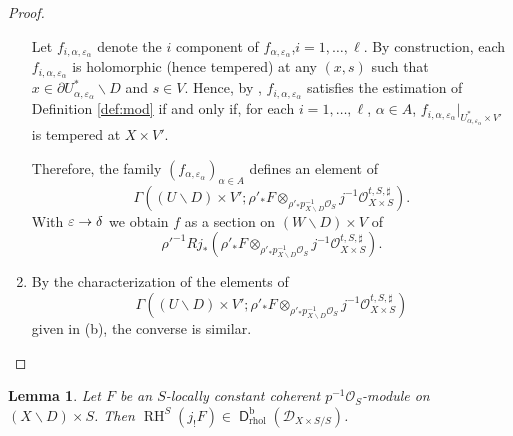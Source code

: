 \documentclass[english]{smfart}
\numberwithin{subsection}{section}
\def\shd{\mathcal{D}}\let\cD\shd
\def\sho{\mathcal{O}}\let\cO\sho
\DeclareMathOperator{\RH}{RH}
\newcommand{\rb}{\mathrm{b}}
\newcommand{\rhol}{\mathrm{rhol}}
\newcommand{\XS}{X\times S}
\newcommand{\DXS}{\shd_{\XS/S}}
\DeclareMathOperator{\rD}{\mathsf{D}}
\let\epsilon\varepsilon
\let\setminus\smallsetminus
\newcommand{\pOS}{p^{-1}\sho_S}
\numberwithin{equation}{section}
\theoremstyle{plain}
\newtheorem{lemma}[equation]{Lemma}
\theoremstyle{definition}
\def\to{\mathchoice{\longrightarrow}{\rightarrow}{\rightarrow}{\rightarrow}}
\begin{document}
\begin{proof}
\begin{enumerate}
Let ${f_{i,\alpha,\epsilon_{\alpha}}}$ denote the $i$ component of $f_{\alpha,\epsilon_{\alpha}}$,$i=1,\dots,\ell$.
By construction, each $f_{i,\alpha,\epsilon_{\alpha}}$ is holomorphic (hence tempered) at any $(x,s)$ such that $x\in\partial U^*_{\alpha,\epsilon_{\alpha}}\setminus D$ and $s\in V$. Hence, by \cite[Prop.\,5.8]{MF-P14}, $f_{i,\alpha,\epsilon_{\alpha}}$ satisfies the estimation of Definition \ref{def:mod} if and only if, for each $i=1,\dots, \ell$, $\alpha \in A$, $f_{i,\alpha,\epsilon_{\alpha}}|_{U^*_{\alpha,\epsilon_{\alpha}}\times V'}$ is tempered at $X\times V'$.

Therefore, the family $(f_{\alpha,\epsilon_{\alpha}})_{\alpha\in A}$ defines an element of
\[
\Gamma((U\setminus D)\times V'; \rho'_*F\otimes_{\rho'_*p_{X\setminus D}^{-1}\sho_S} j^{-1}\sho^{t, S,\sharp}_{\XS}).
\]
With $\epsilon \to \delta$ we obtain $f$ as a section on $(W\setminus D)\times V$ of
\[
\rho'^{-1}Rj_*(\rho'_*F{\otimes}_{\rho'_*p_{X\setminus D}^{-1}\sho_S} j^{-1}\sho^{t, S,\sharp}_{\XS}).
\]

\item
By the characterization of the elements of
\[
\Gamma((U\setminus D)\times V'; \rho'_*F\otimes_{\rho'_*p_{X\setminus D}^{-1}\sho_S} j^{-1}\sho^{t, S,\sharp}_{\XS})
\]
given in (b), the converse is similar.\qedhere
\end{enumerate}
\end{proof}

\begin{lemma}\label{L:211}
Let $F$ be an $S$-locally constant coherent $\pOS$-module on $(X\setminus D)\times S$. Then $\RH^S(j_!F)\in \rD^\rb_\rhol(\DXS)$.
\end{lemma}
\end{document}
